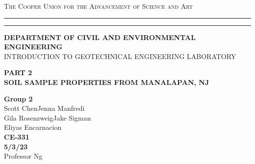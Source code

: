 \begin{titlepage}
    \begin{center}
    {{\Large{\textsc{The Cooper Union for the Advancement of Science and Art}}}} \rule[0.1cm]{15.8cm}{0.1mm}
    \rule[0.5cm]{15.8cm}{0.6mm}
    {\small{\bf DEPARTMENT OF CIVIL AND ENVIRONMENTAL ENGINEERING}}\\
    {\footnotesize{INTRODUCTION TO GEOTECHNICAL ENGINEERING LABORATORY}}
    \end{center}
    \vspace{15mm}
    \begin{center}
    {\large{\bf PART 2\\}}
    \vspace{5mm}
    {\Large{\bf SOIL SAMPLE PROPERTIES FROM MANALAPAN, NJ}}
    \end{center}
    \vspace{35mm}
    \par
    \noindent
    \hfill
    \vspace{20mm}
    \begin{center}
    {\large{\bf {Group 2\\}}}
    {\large{ { Scott Chen\hspace{5mm}Jenna Manfredi\\Gila Rosenzweig\hspace{5mm}Jake Sigman\\Eliyas Encarnacion}}}
    \vspace{40mm}
    {\large {\bf \\CE-331 \\ 5/3/23 \\}}
    \vspace{15mm}
    {\normalsize{Professor Ng}}
    \end{center}
\end{titlepage}